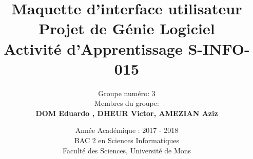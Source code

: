 \documentclass[]{article}
\begin{document}

\title{
{\Huge Maquette d'interface utilisateur}\\
Projet de Génie Logiciel\\
\smallskip
{\small Activité d'Apprentissage \textsf{S-INFO-015}}\\
}

\author{Groupe numéro: 3\\
Membres du groupe:\\
\textbf{DOM Eduardo , DHEUR Victor, AMEZIAN Aziz}\\
}


\date{Année Académique : 2017 - 2018\\
BAC 2 en Sciences Informatiques\\
\vspace{1cm}
Faculté des Sciences, Université de Mons}


%
%
%
%
%
%

\end{document}
